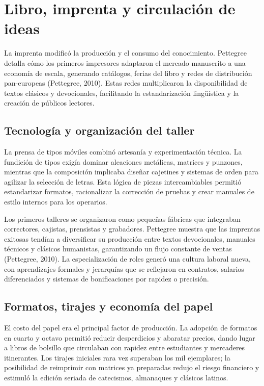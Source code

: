 \chapter{Libro, imprenta y circulación de ideas}

La imprenta modificó la producción y el consumo del conocimiento. Pettegree detalla cómo los primeros impresores adaptaron el mercado manuscrito a una economía de escala, generando catálogos, ferias del libro y redes de distribución pan-europeas (Pettegree, 2010). Estas redes multiplicaron la disponibilidad de textos clásicos y devocionales, facilitando la estandarización lingüística y la creación de públicos lectores.

\section{Tecnología y organización del taller}
La prensa de tipos móviles combinó artesanía y experimentación técnica. La fundición de tipos exigía dominar aleaciones metálicas, matrices y punzones, mientras que la composición implicaba diseñar cajetines y sistemas de orden para agilizar la selección de letras. Esta lógica de piezas intercambiables permitió estandarizar formatos, racionalizar la corrección de pruebas y crear manuales de estilo internos para los operarios.

Los primeros talleres se organizaron como pequeñas fábricas que integraban correctores, cajistas, prensistas y grabadores. Pettegree muestra que las imprentas exitosas tendían a diversificar su producción entre textos devocionales, manuales técnicos y clásicos humanistas, garantizando un flujo constante de ventas (Pettegree, 2010). La especialización de roles generó una cultura laboral nueva, con aprendizajes formales y jerarquías que se reflejaron en contratos, salarios diferenciados y sistemas de bonificaciones por rapidez o precisión.

\section{Formatos, tirajes y economía del papel}
El costo del papel era el principal factor de producción. La adopción de formatos en cuarto y octavo permitió reducir desperdicios y abaratar precios, dando lugar a libros de bolsillo que circulaban con rapidez entre estudiantes y mercaderes itinerantes. Los tirajes iniciales rara vez superaban los mil ejemplares; la posibilidad de reimprimir con matrices ya preparadas redujo el riesgo financiero y estimuló la edición seriada de catecismos, almanaques y clásicos latinos.

